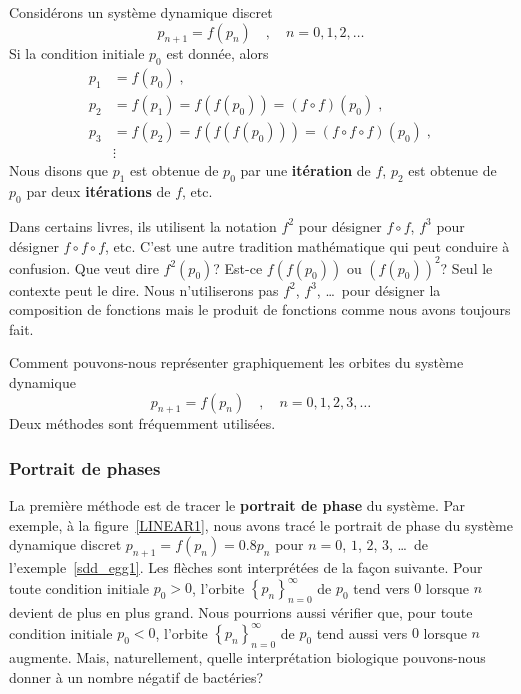 {\begin{rmk}
Considérons un système dynamique discret
\[
p_{n+1} = f(p_n) \quad , \quad n=0, 1, 2, \ldots
\]
Si la condition initiale $p_0$ est donnée, alors
\begin{align*}
p_1 &= f(p_0) \; , \\
p_2 &= f(p_1) = f(f(p_0)) = (f\circ f)(p_0) \; , \\
p_3 &= f(p_2) = f(f(f(p_0))) = (f\circ f\circ f)(p_0) \; , \\
& \vdots
\end{align*}
Nous disons que $p_1$ est obtenue de $p_0$ par une {\bfseries itération} de
$f$, $p_2$ est obtenue de $p_0$ par deux {\bfseries itérations} de
$f$, etc.

Dans certains livres, ils utilisent la notation $f^2$ pour désigner
$f\circ f$, $f^3$ pour désigner $f\circ f \circ f$, etc.  C'est une
autre tradition mathématique qui peut conduire à confusion.  Que veut
dire $f^2(p_0)$?  Est-ce $f(f(p_0))$ ou $(f(p_0))^2$?  Seul le
contexte peut le dire. Nous n'utiliserons pas $f^2$, $f^3$,
\ldots\ pour désigner la composition de fonctions mais le produit de
fonctions comme nous avons toujours fait.
\end{rmk}

Comment pouvons-nous représenter graphiquement les orbites du système
dynamique
\[
p_{n+1} = f(p_n) \quad , \quad n=0, 1, 2, 3, \ldots
\]
Deux méthodes sont fréquemment utilisées.

\subsubsection{Portrait de phases}

La première méthode est de tracer le {\bfseries portrait de phase} du
système.  Par
exemple, à la figure~\ref{LINEAR1}, nous avons tracé le portrait de
phase du système dynamique discret $p_{n+1} = f(p_n) = 0.8 p_n$ pour $n=0$,
$1$, $2$, $3$, \ldots\ de l'exemple~\ref{sdd_egg1}.  Les flèches sont
interprétées de la façon suivante.  Pour toute condition initiale
$p_0> 0$, l'orbite $\displaystyle \left\{ p_n \right\}_{n=0}^\infty$
de $p_0$ tend vers $0$ lorsque $n$ devient de plus en plus grand.  Nous
pourrions aussi vérifier que, pour toute condition initiale $p_0<0$,
l'orbite $\displaystyle \left\{ p_n \right\}_{n=0}^\infty$ de $p_0$
tend aussi vers $0$ lorsque $n$ augmente.  Mais, naturellement, quelle
interprétation biologique pouvons-nous donner à un nombre négatif de
bactéries?

}
